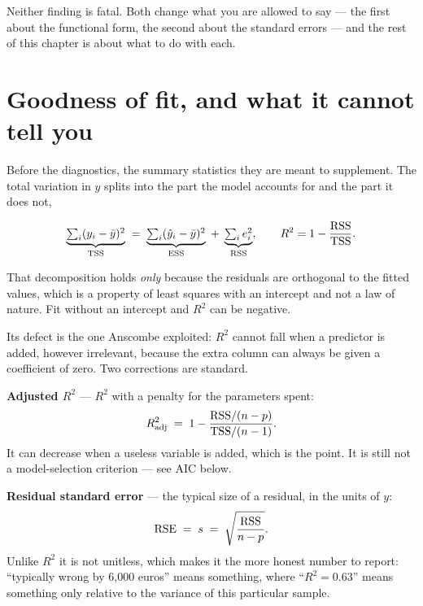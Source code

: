 \documentclass[
  letterpaper,
  10pt,
  twoside,
  openright,
  numbers=noenddot,
  chapterprefix=true]{scrbook}
\begin{document}
Neither finding is fatal. Both change what you are allowed to say ---
the first about the functional form, the second about the standard
errors --- and the rest of this chapter is about what to do with each.

\section{Goodness of fit, and what it cannot tell
you}\label{goodness-of-fit-and-what-it-cannot-tell-you}

Before the diagnostics, the summary statistics they are meant to
supplement. The total variation in \(y\) splits into the part the model
accounts for and the part it does not,

\[
\underbrace{\textstyle\sum_i (y_i - \bar y)^2}_{\text{TSS}}
\thickspace=\thickspace
\underbrace{\textstyle\sum_i (\hat y_i - \bar y)^2}_{\text{ESS}}
\thickspace+\thickspace
\underbrace{\textstyle\sum_i e_i^2}_{\text{RSS}},
\qquad
R^2 = 1 - \frac{\mathrm{RSS}}{\mathrm{TSS}} .
\]

That decomposition holds \emph{only} because the residuals are
orthogonal to the fitted values, which is a property of least squares
with an intercept and not a law of nature. Fit without an intercept and
\(R^2\) can be negative.

Its defect is the one Anscombe exploited: \(R^2\) cannot fall when a
predictor is added, however irrelevant, because the extra column can
always be given a coefficient of zero. Two corrections are standard.

\begin{qmibdefinition}

{\textbf{Adjusted \(R^2\)}} --- \(R^2\) with a penalty for the
parameters spent: \[
R^2_{\text{adj}} \thickspace=\thickspace 1 - \frac{\mathrm{RSS}/(n-p)}{\mathrm{TSS}/(n-1)} .
\] It can decrease when a useless variable is added, which is the point.
It is still not a model-selection criterion --- see AIC below.

\end{qmibdefinition}

\begin{qmibdefinition}

{\textbf{Residual standard error}} --- the typical size of a residual,
in the units of \(y\): \[
\mathrm{RSE} \thickspace=\thickspace s \thickspace=\thickspace \sqrt{\frac{\mathrm{RSS}}{n-p}} .
\] Unlike \(R^2\) it is not unitless, which makes it the more honest
number to report: ``typically wrong by 6,000 euros'' means something,
where ``\(R^2 = 0.63\)'' means something only relative to the variance
of this particular sample.

\end{qmibdefinition}
\end{document}

